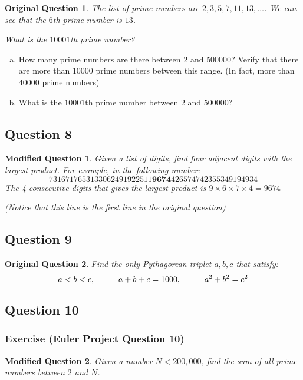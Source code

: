 \documentclass[12pt]{article}
\newtheorem*{modQuestion*}{Modified Question}
\newtheorem*{origQuestion*}{Original Question}
\begin{document}
\begin{origQuestion*}
The list of prime numbers are $2, 3, 5, 7, 11, 13, \ldots$. We can see that the $6$th prime number is $13$. 

What is the $10001$th prime number?
\end{origQuestion*}

\begin{enumerate}[(a)]
\item How many prime numbers are there between $2$ and $500000$? Verify that there are more than $10000$ prime numbers between this range. (In fact, more than $40000$ prime numbers)
\item What is the $10001$th prime number between $2$ and $500000$?
\end{enumerate}
\subsection*{Question 8} 

\begin{modQuestion*}
Given a list of digits, find four adjacent digits with the largest product. For example, in the following number:
\[
7316717653133062491922511\mathbf{9674}426574742355349194934
\]
The 4 consecutive digits that gives the largest product is $9 \times 6 \times 7 \times 4 = 9674$

(Notice that this line is the first line in the original question)
\end{modQuestion*}
\subsection*{Question 9} 

\begin{origQuestion*}
Find the only Pythagorean triplet $a, b, c$ that satisfy:
\[
a < b < c, \hspace{1.0cm} a + b + c = 1000, \hspace{1.0cm} a^2 + b^2 = c^2
\]
\end{origQuestion*}
\subsection*{Question 10} 

\subsubsection*{Exercise (Euler Project Question 10)}

\begin{modQuestion*}
Given a number $N < 200,000$, find the sum of all prime numbers between $2$ and $N$.
\end{modQuestion*}
\end{document}
